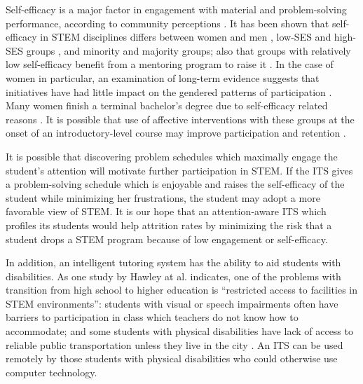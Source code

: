 \documentclass[hidelinks,11pt]{article}
\begin{document}
Self-efficacy is a major factor in engagement with material and problem-solving
performance, according to community perceptions {\citep{vivian2014}}. It has
been shown that self-efficacy in STEM disciplines differs between women and men
{\citep{boy2013, gonzalez2012}}, low-SES and high-SES groups
{\citep{gonzalez2012}}, and minority and majority groups; also that groups with
relatively low self-efficacy benefit from a mentoring program to raise it
{\citep{macphee2013}}.  In the case of women in particular, an examination of
long-term evidence suggests that initiatives have had little impact on the
gendered patterns of participation  {\citep{smith2011}}. Many women finish a
terminal bachelor's degree due to self-efficacy related reasons
{\citep{boy2013}}.  It is possible that use of affective interventions with
these groups at the onset of an introductory-level course may improve
participation and retention {\citep{jraidi2011}}. 

It is possible that discovering problem schedules which maximally engage the
student’s attention will motivate further participation in STEM. If the ITS
gives a problem-solving schedule which is enjoyable and raises the
self-efficacy of the student while minimizing her frustrations, the student may
adopt a more favorable view of STEM. It is our hope that an attention-aware ITS
which profiles its students would help attrition rates by minimizing the risk
that a student drops a STEM program because of low engagement or self-efficacy.

In addition, an intelligent tutoring system has the ability to aid students
with disabilities.  As one study by Hawley at al.  indicates, one of the
problems with transition from high school to higher education is ``restricted
access to facilities in STEM environments'': students with visual or speech
impairments often have barriers to participation in class which teachers do not
know how to accommodate; and some students with physical disabilities have lack
of access to reliable public transportation unless they live in the city
{\citep{hawley2013, chapman2014}}. An ITS can be used remotely by those
students with physical disabilities who could otherwise use computer
technology.
\end{document}
